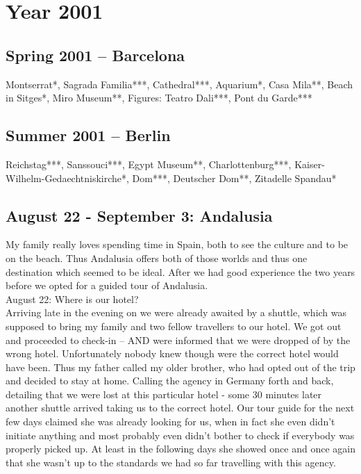 \chapter{Year 2001}
\label{2001}

\section{Spring 2001 -- Barcelona}
\label{2001:Barcelona}

Montserrat*, Sagrada Familia***, Cathedral***, Aquarium*, Casa Mila**, Beach in Sitges*, Miro Museum**, Figures: Teatro Dali***, Pont du Garde***

\section{Summer 2001 -- Berlin}
\label{2001:Berlin}

Reichstag***, Sanssouci***, Egypt Museum**, Charlottenburg***, Kaiser-Wilhelm-Gedaechtniskirche*, Dom***, Deutscher Dom**, Zitadelle Spandau*

\section{August 22 - September 3: Andalusia}
\label{2001:Andalusia}

My family really loves spending time in Spain, both to see the culture and to be on the beach. Thus Andalusia offers both of those worlds and thus one destination which seemed to be ideal. After we had good experience the two years before we opted for a guided tour of Andalusia.\\

August 22: Where is our hotel?\\
Arriving late in the evening on we were already awaited by a shuttle, which was supposed to bring my family and two fellow travellers to our hotel. We got out and proceeded to check-in -- AND were informed that we were dropped of by the wrong hotel. Unfortunately nobody knew though were the correct hotel would have been. Thus my father called my older brother, who had opted out of the trip and decided to stay at home. Calling the agency in Germany forth and back, detailing that we were lost at this particular hotel - some 30 minutes later another shuttle arrived taking us to the correct hotel. Our tour guide for the next few days claimed she was already looking for us, when in fact she even didn't initiate anything and most probably even didn't bother to check if everybody was properly picked up. At least in the following days she showed once and once again that she wasn't up to the standards we had so far travelling with this agency.\\

